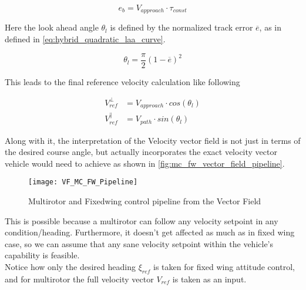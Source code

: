 \begin{equation}
    e_b = V_{approach} \cdot \tau_{const}
\label{eq:hybrid_track_error_boundary}
\end{equation}

Here the look ahead angle $\theta_l$ is defined by the normalized track error $\overline{e}$, as in \cite{stastny_low-altitude_2020} defined in \autoref{eq:hybrid_quadratic_laa_curve}.

\begin{equation}
    \theta_l = \frac{\pi}{2}(1-\overline{e})^2
\label{eq:hybrid_quadratic_laa_curve}
\end{equation}

This leads to the final reference velocity calculation like following

\begin{equation}
    \begin{split}
        V_{ref}^{\perp} &= V_{approach} \cdot cos(\theta_l)\\
        V_{ref}^{\parallel} &= V_{path} \cdot sin(\theta_l)
    \end{split}
\label{eq:hybrid_velocity_components}
\end{equation}

Along with it, the interpretation of the Velocity vector field is not just in terms of the desired course angle, but actually incorporates the exact velocity vector vehicle would need to achieve as shown in \autoref{fig:mc_fw_vector_field_pipeline}.

\begin{figure}[h]
\centering
\texttt{[image: VF\_MC\_FW\_Pipeline]}
\caption{Multirotor and Fixedwing control pipeline from the Vector Field}
\label{fig:mc_fw_vector_field_pipeline}
\end{figure}

This is possible because a multirotor can follow any velocity setpoint in any condition/heading. Furthermore, it doesn't get affected as much as in fixed wing case, so we can assume that any sane velocity setpoint within the vehicle's capability is feasible.\\

Notice how only the desired heading $\xi_{ref}$ is taken for fixed wing attitude control, and for multirotor the full velocity vector $V_{ref}$ is taken as an input.